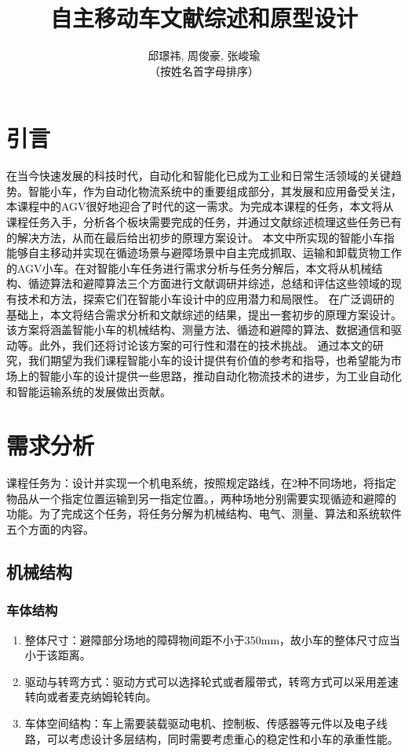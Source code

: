 \documentclass{report}
\title{自主移动车文献综述和原型设计}
\author{邱璟祎, 周俊豪, 张峻瑜\\
  （按姓名首字母排序）
}
\begin{document}
\maketitle
\tableofcontents
\newpage
\chapter{引言}
在当今快速发展的科技时代，自动化和智能化已成为工业和日常生活领域的关键趋势。智能小车，作为自动化物流系统中的重要组成部分，其发展和应用备受关注，本课程中的AGV很好地迎合了时代的这一需求。为完成本课程的任务，本文将从课程任务入手，分析各个板块需要完成的任务，并通过文献综述梳理这些任务已有的解决方法，从而在最后给出初步的原理方案设计。
本文中所实现的智能小车指能够自主移动并实现在循迹场景与避障场景中自主完成抓取、运输和卸载货物工作的AGV小车。在对智能小车任务进行需求分析与任务分解后，本文将从机械结构、循迹算法和避障算法三个方面进行文献调研并综述，总结和评估这些领域的现有技术和方法，探索它们在智能小车设计中的应用潜力和局限性。
在广泛调研的基础上，本文将结合需求分析和文献综述的结果，提出一套初步的原理方案设计。该方案将涵盖智能小车的机械结构、测量方法、循迹和避障的算法、数据通信和驱动等。此外，我们还将讨论该方案的可行性和潜在的技术挑战。
通过本文的研究，我们期望为我们课程智能小车的设计提供有价值的参考和指导，也希望能为市场上的智能小车的设计提供一些思路，推动自动化物流技术的进步，为工业自动化和智能运输系统的发展做出贡献。


\chapter{需求分析}
课程任务为：设计并实现一个机电系统，按照规定路线，在2种不同场地，将指定物品从一个指定位置运输到另一指定位置。，两种场地分别需要实现循迹和避障的功能。为了完成这个任务，将任务分解为机械结构、电气、测量、算法和系统软件五个方面的内容。
\section{机械结构}
\label{sec:label}
\subsection{车体结构}
\label{subsec:label}
\begin{enumerate}
\item 整体尺寸：避障部分场地的障碍物间距不小于350mm，故小车的整体尺寸应当小于该距离。
\item 驱动与转弯方式：驱动方式可以选择轮式或者履带式，转弯方式可以采用差速转向或者麦克纳姆轮转向。
  \item 车体空间结构：车上需要装载驱动电机、控制板、传感器等元件以及电子线路，可以考虑设计多层结构，同时需要考虑重心的稳定性和小车的承重性能。
\end{enumerate}
\end{document}
